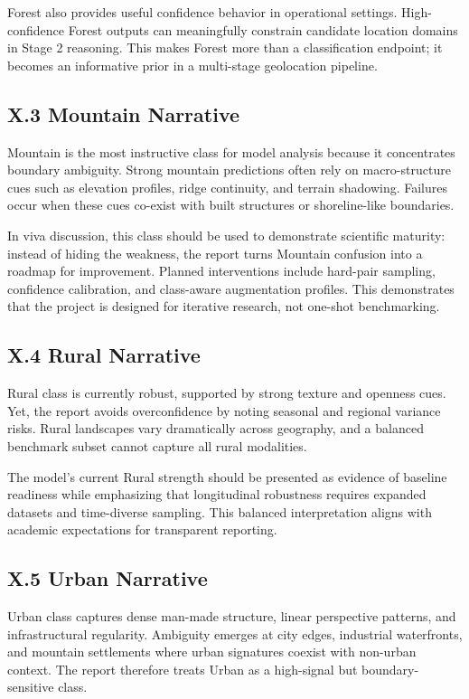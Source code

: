 Forest also provides useful confidence behavior in operational settings. High-confidence Forest outputs can meaningfully constrain candidate location domains in Stage 2 reasoning. This makes Forest more than a classification endpoint; it becomes an informative prior in a multi-stage geolocation pipeline.

\subsection*{X.3 Mountain Narrative}
Mountain is the most instructive class for model analysis because it concentrates boundary ambiguity. Strong mountain predictions often rely on macro-structure cues such as elevation profiles, ridge continuity, and terrain shadowing. Failures occur when these cues co-exist with built structures or shoreline-like boundaries.

In viva discussion, this class should be used to demonstrate scientific maturity: instead of hiding the weakness, the report turns Mountain confusion into a roadmap for improvement. Planned interventions include hard-pair sampling, confidence calibration, and class-aware augmentation profiles. This demonstrates that the project is designed for iterative research, not one-shot benchmarking.

\subsection*{X.4 Rural Narrative}
Rural class is currently robust, supported by strong texture and openness cues. Yet, the report avoids overconfidence by noting seasonal and regional variance risks. Rural landscapes vary dramatically across geography, and a balanced benchmark subset cannot capture all rural modalities.

The model's current Rural strength should be presented as evidence of baseline readiness while emphasizing that longitudinal robustness requires expanded datasets and time-diverse sampling. This balanced interpretation aligns with academic expectations for transparent reporting.

\subsection*{X.5 Urban Narrative}
Urban class captures dense man-made structure, linear perspective patterns, and infrastructural regularity. Ambiguity emerges at city edges, industrial waterfronts, and mountain settlements where urban signatures coexist with non-urban context. The report therefore treats Urban as a high-signal but boundary-sensitive class.

